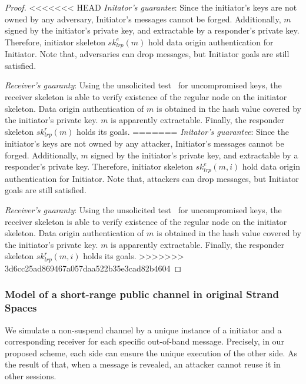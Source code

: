 \begin{proof}

<<<<<<< HEAD
\emph{Initator's guarantee}: Since the initiator’s keys are not owned by any adversary, Initiator's messages cannot be forged. Additionally, $m$ signed by the initiator's private key, and extractable by a responder's private key. Therefore, initiator skeleton $sk^e_{lrp}(m)$ hold data origin authentication for Initiator. Note that, adversaries can drop messages, but Initiator goals are still satisfied. 

\emph{Receiver's guaranty}: Using the unsolicited test~\cite{Guttman:2002:ATS:568264.568267} for uncompromised keys, the receiver skeleton is able to verify existence of the regular node on the initiator skeleton. Data origin authentication of $m$ is obtained in the hash value covered by the initiator's private key. $m$ is apparently extractable. Finally, the responder skeleton $sk^r_{lrp}(m)$ holds its goals. 
=======
\emph{Initator's guarantee}: Since the initiator’s keys are not owned by any attacker, Initiator's messages cannot be forged. Additionally, $m$ signed by the initiator's private key, and extractable by a responder's private key. Therefore, initiator skeleton $sk^e_{lrp}(m,i)$ hold data origin authentication for Initiator. Note that, attackers can drop messages, but Initiator goals are still satisfied. 

\emph{Receiver's guaranty}: Using the unsolicited test~\cite{Guttman:2002:ATS:568264.568267} for uncompromised keys, the receiver skeleton is able to verify existence of the regular node on the initiator skeleton. Data origin authentication of $m$ is obtained in the hash value covered by the initiator's private key. $m$ is apparently extractable. Finally, the responder skeleton $sk^r_{lrp}(m,i)$ holds its goals. 
>>>>>>> 3d6cc25ad869467a057daa522b35e3cad82b4604
 \end{proof}

\subsubsection*{Model of a short-range public channel in original Strand Spaces}\label{shortrange}

We simulate a non-suspend channel by a unique instance of a initiator and a corresponding receiver for each specific out-of-band message. Precisely, in our proposed scheme, each side can ensure the unique execution of the other side. As the result of that, when a message is revealed, an attacker cannot reuse it in other sessions. 

